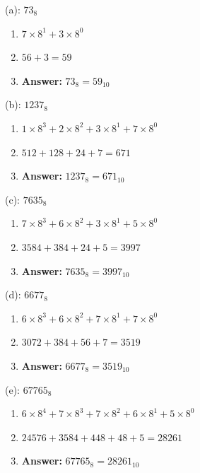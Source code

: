 \documentclass{article}
\begin{document}
\vspace*{0.25cm}

\noindent (a): $73_8$

\begin{enumerate}
    \item $7 \times 8^1 + 3 \times 8^0$
    \item $56 + 3 = 59$
    \item \textbf{Answer:} $73_8 = 59_{10}$
\end{enumerate}

\vspace*{0.5cm}

\noindent (b): $1237_8$

\begin{enumerate}
    \item $1 \times 8^3 + 2 \times 8^2 + 3 \times 8^1 + 7 \times 8^0$
    \item $512 + 128 + 24 + 7 = 671$
    \item \textbf{Answer:} $1237_8 = 671_{10}$
\end{enumerate}

\newpage

\noindent (c): $7635_8$

\begin{enumerate}
    \item $7 \times 8^3 + 6 \times 8^2 + 3 \times 8^1 + 5 \times 8^0$
    \item $3584 + 384 + 24 + 5 = 3997$
    \item \textbf{Answer:} $7635_8 = 3997_{10}$
\end{enumerate}

\vspace*{0.5cm}

\noindent (d): $6677_8$

\begin{enumerate}
    \item $6 \times 8^3 + 6 \times 8^2 + 7 \times 8^1 + 7 \times 8^0$
    \item $3072 + 384 + 56 + 7 = 3519$
    \item \textbf{Answer:} $6677_8 = 3519_{10}$
\end{enumerate}

\vspace*{0.5cm}

\noindent (e): $67765_8$

\begin{enumerate}
    \item $6 \times 8^4 + 7 \times 8^3 + 7 \times 8^2 + 6 \times 8^1 + 5 \times 8^0$
    \item $24576 + 3584 + 448 + 48 + 5 = 28261$
    \item \textbf{Answer:} $67765_8 = 28261_{10}$
\end{enumerate}
\end{document}
